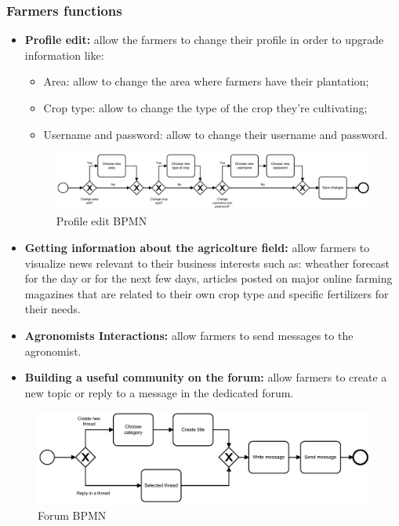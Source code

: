 \documentclass[table, 12pt]{article}
\begin{document}
\subsubsection{Farmers functions}
\begin{itemize}
    \item \textbf{Profile edit: }allow the farmers to change their profile in order to upgrade information like: 
    \begin{itemize}
        \item[] Area: allow to change the area where farmers have their plantation;
        \item[] Crop type: allow to change the type of the crop they're cultivating;
        \item[] Username and password: allow to change their username and password.
    \end{itemize}
    \begin{center}
        \begin{figure}[H]
            \includegraphics[width=\textwidth]{assets/BPMN/ProfileEditBpmn}
            \caption{Profile edit BPMN}
            \label{fig: profileedit}
        \end{figure}
    \end{center}
    \item \textbf{Getting information about the agricolture field:} allow farmers to visualize news relevant to their business interests such as: wheather forecast for the day or for the next few days, articles posted on major online farming magazines that are related to their own crop type and specific fertilizers for their needs.
    \item \textbf{Agronomists Interactions:} allow farmers to send messages to the agronomist.
    \item \textbf{Building a useful community on the forum:} allow farmers to create a new topic or reply to a message in the dedicated forum.
\end{itemize}
\begin{center}
    \begin{figure}[H]
        \includegraphics[width=\textwidth]{assets/BPMN/ForumBpmn}
        \caption{Forum BPMN}
        \label{fig: forum}
    \end{figure}
\end{center}
\end{document}
